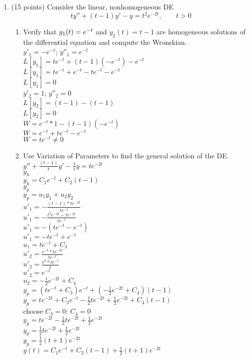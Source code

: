 \documentclass{article}
\begin{document}
\begin{enumerate}
\bigskip
\item (15 points) Consider the linear, nonhomogeneous DE
\[
ty'' + (t-1) y' - y = t^2 e^{-2t}, \qquad t>0
\]
\begin{enumerate}
\item Verify that $y_1(t) = e\sp{-t}$ and $y_2(t) = t-1$ are homogeneous solutions of the differential equation and compute the Wronskian.
\\$y'_1=-e^{-t}$; $y''_1=e^{-t}$
\\$L[y_1]=te^{-t}+(t-1)(-e^{-t})-e^{-t}$
\\$L[y_1]=te^{-t}+e^{-t}-te^{-t}-e^{-t}$
\\$L[y_1]=0$
\\$y'_2=1$; $y''_2=0$
\\$L[y_2]=(t-1)-(t-1)$
\\$L[y_2]=0$
\\$W=e^{-t}*1-(t-1)(-e^{-t})$
\\$W=e^{-t}+te^{-t}-e^{-t}$
\\$W=te^{-t}\ne0$
\item Use Variation of Parameters to find the general solution of the DE.
\\$y''+\frac{(t-1)}{t}y'-\frac{1}{t}y=te^{-2t}$
\\$y_h$
\\$y_h=C_1e^{-t}+C_2(t-1)$
\\$y_p$
\\$y_p=u_1y_1+u_2y_2$
\\$u'_1=-\frac{(t-1)*te^{-2t}}{te^{-t}}$
\\$u'_1=-\frac{t^3e^{-2t}-te^{-2t}}{te^{-t}}$
\\$u'_1=-(te^{-t}-e^{-t})$
\\$u'_1=-te^{-t}+e^{-t}$
\\$u_1=te^{-t}+C_3$
\\$u'_2=\frac{e^{-t}*te^{-2t}}{te^{-t}}$
\\$u'_2=\frac{e^{0}*te^{-t}}{t}$
\\$u'_2=e^{-t}$
\\$u_2=-\frac{1}{2}e^{-2t}+C_4$
\\$y_p=(te^{-t}+C_3)e^{-t}+(-\frac{1}{2}e^{-2t}+C_4)(t-1)$
\\$y_p=te^{-2t}+C_3e^{-t}-\frac{1}{2}te^{-2t}+\frac{1}{2}e^{-2t}+C_4(t-1)$
\\choose $C_3=0$; $C_4=0$
\\$y_p=te^{-2t}-\frac{1}{2}te^{-2t}+\frac{1}{2}e^{-2t}$
\\$y_p=\frac{1}{2}te^{-2t}+\frac{1}{2}e^{-2t}$
\\$y_p=\frac{1}{2}(t+1)e^{-2t}$
\\$y(t)=C_1e^{-t}+C_2(t-1)+\frac{1}{2}(t+1)e^{-2t}$
\end{enumerate}

\end{enumerate}
\end{document}
